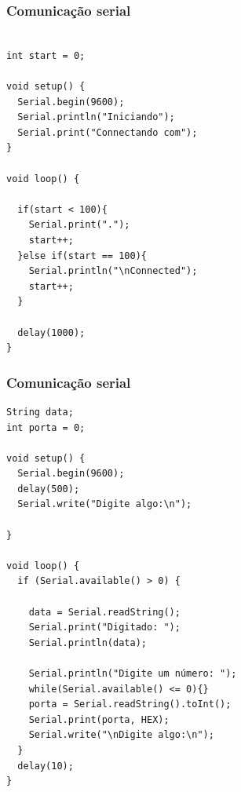 \documentclass{beamer}
\begin{document}
\begin{frame}[fragile]
\frametitle{Comunicação serial}

\scriptsize
\begin{lstlisting}

int start = 0;

void setup() {
  Serial.begin(9600); 
  Serial.println("Iniciando");
  Serial.print("Connectando com");
}

void loop() {

  if(start < 100){
    Serial.print(".");
    start++;
  }else if(start == 100){
    Serial.println("\nConnected");
    start++;
  }

  delay(1000);
}

\end{lstlisting}

\end{frame}


\begin{frame}[fragile]
\frametitle{Comunicação serial}

\tiny
\begin{lstlisting}
String data;
int porta = 0;

void setup() {
  Serial.begin(9600);
  delay(500);
  Serial.write("Digite algo:\n");
  
}

void loop() {
  if (Serial.available() > 0) {
    
    data = Serial.readString(); 
    Serial.print("Digitado: ");
    Serial.println(data);

    Serial.println("Digite um número: ");
    while(Serial.available() <= 0){}
    porta = Serial.readString().toInt();
    Serial.print(porta, HEX); 
    Serial.write("\nDigite algo:\n");
  }
  delay(10);
}
\end{lstlisting}

\end{frame}
\end{document}
